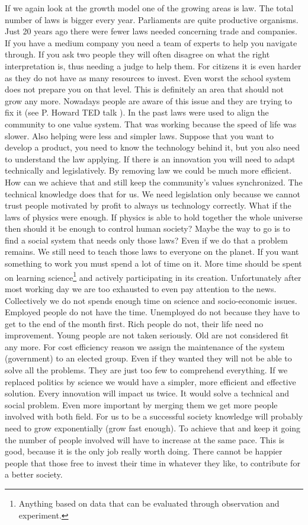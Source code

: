 \documentclass{article}
\begin{document}
If we again look at the growth model one of the growing areas is law.
The total number of laws is bigger every year.
Parliaments are quite productive organisms.
Just 20 years ago there were fewer laws needed concerning trade and companies.
If you have a medium company you need a team of experts to help you navigate through.
If you ask two people they will often disagree on what the right interpretation is, thus needing a judge to help them.
For citizens it is even harder as they do not have as many resources to invest.
Even worst the school system does not prepare you on that level.
This is definitely an area that should not grow any more.
Nowadays people are aware of this issue and they are trying to fix it (see P. Howard TED talk \cite{simple_law}).
In the past laws were used to align the community to one value system.
That was working because the speed of life was slower.
Also helping were less and simpler laws.
Suppose that you want to develop a product, you need to know the technology behind it, but you also need to understand the law applying.
If there is an innovation you will need to adapt technically and legislatively.
By removing law we could be much more efficient.
How can we achieve that and still keep the community's values synchronized.
The technical knowledge does that for us.
We need legislation only because we cannot trust people motivated by profit to always us  technology correctly.
What if the laws of physics were enough.
If physics is able to hold together the whole universe then should it be enough to control human society?
Maybe the way to go is to find a social system that needs only those laws?
Even if we do that a problem remains.
We still need to teach those laws to everyone on the planet.
If you want something to work you must spend a lot of time on it.
More time should be spent on learning science\footnote{Anything based on data that can be evaluated through observation and experiment.} and actively participating in its creation.
Unfortunately after most working day we are too exhausted to even pay attention to the news.
Collectively we do not spends enough time on science and socio-economic issues.
Employed people do not have the time.
Unemployed do not because they have to get to the end of the month first.
Rich people do not, their life need no improvement.
Young people are not taken seriously.
Old are not considered fit any more.
For cost efficiency reason we assign the maintenance of the system (government) to an elected group.
Even if they wanted they will not be able to solve all the problems.
They are just too few to comprehend everything.
If we replaced politics by science we would have a simpler, more efficient and effective solution.
Every innovation will impact us twice.
It would solve a technical and social problem.
Even more important by merging them we get more people involved with both field.
For us to be a successful society knowledge will probably need to grow exponentially (grow fast enough).
To achieve that and keep it going the number of people involved will have to increase at the same pace.
This is good, because it is the only job really worth doing.
There cannot be happier people that those free to invest their time in whatever they like, to contribute for a better society.
\end{document}
